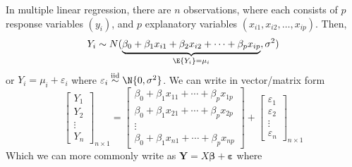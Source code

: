 In multiple linear regression, there are $ n $ observations, where each consists of
$ p $ response variables $ (y_i) $, and $ p $ explanatory variables $ (x_{i1},x_{i2},\ldots,x_{ip}) $.
Then,
\[ Y_i \sim N(
    \underbrace{\beta_0+\beta_1x_{i1}+
        \beta_2x_{i2}+\cdots +\beta_p x_{ip}}_{\E{Y_i}=
        \mu_i},\sigma^2) \]
or $ Y_i=\mu_i+\varepsilon_i $ where $ \varepsilon_i \stackrel{\text{iid}}{\sim}
    \N{0,\sigma^2} $.
We can write in vector/matrix form
\[ \begin{bmatrix}
        Y_1    \\
        Y_2    \\
        \vdots \\
        Y_n
    \end{bmatrix}_{n\times 1}=
    \begin{bmatrix}
        \beta_0+\beta_1x_{11}+\cdots+\beta_p x_{1p} \\
        \beta_0+\beta_1x_{21}+\cdots+\beta_p x_{2p} \\
        \vdots                                      \\
        \beta_0+\beta_1x_{n1}+\cdots+\beta_p x_{n p}
    \end{bmatrix}+
    \begin{bmatrix}
        \varepsilon_1 \\
        \varepsilon_2 \\
        \vdots        \\
        \varepsilon_n
    \end{bmatrix}_{n\times 1} \]
Which we can more commonly write as $ \symbf{Y}=X\symbf{\beta}+\symbf{\varepsilon} $ where
